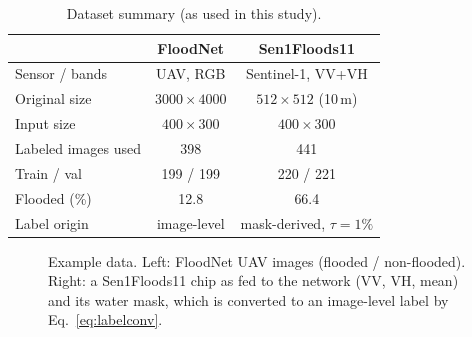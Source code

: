 \documentclass[conference]{IEEEtran}
\newif\ifreview
\newcommand{\REV}[1]{\ifreview\textcolor{red}{\textbf{[Revise: #1]}}\fi}
\begin{document}
\begin{table}[t]
\centering
\caption{Dataset summary (as used in this study).}
\label{tab:datasets}
\footnotesize
\setlength{\tabcolsep}{3pt}
\begin{tabular}{lcc}
\toprule
 & \textbf{FloodNet} & \textbf{Sen1Floods11}\\
\midrule
Sensor / bands & UAV, RGB & Sentinel-1, VV+VH\\
Original size & $3000{\times}4000$ & $512{\times}512$ (10\,m)\\
Input size & $400{\times}300$ & $400{\times}300$\\
Labeled images used & 398 & 441\\
Train / val & 199 / 199 & 220 / 221\\
Flooded (\%) & 12.8 & 66.4\\
Label origin & image-level & mask-derived, $\tau{=}1\%$\\
\bottomrule
\end{tabular}
\end{table}
\REV{[A5] Table~\ref{tab:datasets} is a DRAFT filled from the text;
verify every value. Then \emph{delete the corresponding prose} in
Related Work/Setup to save space. Also add a sample-image figure
(below).}

\begin{figure}[t]
\centering
{}\hfill
{}\hfill
{}\hfill
{}
\caption{Example data. Left: FloodNet UAV images (flooded / non-flooded).
Right: a Sen1Floods11 chip as fed to the network (VV, VH, mean) and its
water mask, which is converted to an image-level label by
Eq.~\eqref{eq:labelconv}.}
\label{fig:samples}
\end{figure}
\REV{[A5] Replace the placeholder boxes with real images (2 FloodNet
+ 1--2 SAR chips with their masks; ideally one SAR chip near the
$\tau$ boundary, i.e., $\sim$1--3\% water, to show how hard the
labeling is). Keep file sizes small (PNG/JPG $\leq$ 300\,KB each).}
\end{document}
